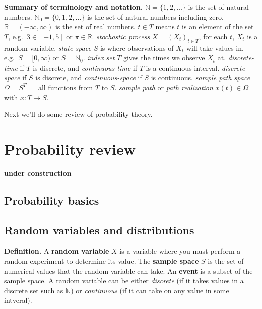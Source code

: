 \documentclass[
]{article}
\begin{document}
\textbf{Summary of terminology and notation.}
\(\mathbb N=\{1,2,\ldots\}\) is the set of natural numbers.
\(\mathbb N_0=\{0,1,2,\ldots\}\) is the set of natural numbers including
zero. \(\mathbb R=(-\infty,\infty)\) is the set of real numbers.
\(t\in T\) means \(t\) is an element of the set \(T\), e.g.~\(3\in [-1,5]\) or
\(\pi\in\mathbb R\). \emph{stochastic process} \(X=(X_t)_{t\in T}\), for each
\(t\), \(X_t\) is a random variable. \emph{state space} \(S\) is where
observations of \(X_t\) will take values in, e.g.~\(S=[0,\infty)\) or
\(S=\mathbb N_0\). \emph{index set} \(T\) gives the times we observe \(X_t\)
at. \emph{discrete-time} if \(T\) is discrete, and \emph{continuous-time} if
\(T\) is a continuous interval. \emph{discrete-space} if \(S\) is discrete,
and \emph{continuous-space} if \(S\) is continuous. \emph{sample path space}
\(\Omega=S^T=\) all functions from \(T\) to \(S\). \emph{sample path} or \emph{path
realization} \(x(t)\in\Omega\) with \(x:T\to S\).

Next we'll do some review of probability theory.

\hypertarget{probability-review}{%
\section{Probability review}\label{probability-review}}

\textbf{under construction}

\hypertarget{probability-basics}{%
\subsection{Probability basics}\label{probability-basics}}

\hypertarget{random-variables-and-distributions}{%
\subsection{Random variables and distributions}\label{random-variables-and-distributions}}

\textbf{Definition.} A \textbf{random variable} \(X\) is a variable where you must perform a random experiment to determine its value. The \textbf{sample space} \(S\) is the set of numerical values that the random variable can take. An \textbf{event} is a subset of the sample space. A random variable can be either \emph{discrete} (if it takes values in a discrete set such as \(\mathbb N\)) or \emph{continuous} (if it can take on any value in some intveral).
\end{document}
